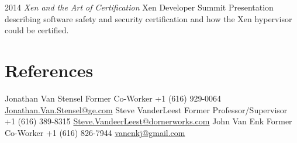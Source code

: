 \documentclass[print]{template/friggeri-cv} %
\begin{document}
\begin{entrylist}
\longentry
{2014}
{\emph{Xen and the Art of Certification}}
{Xen Developer Summit}
{Presentation describing software safety and security certification and how the Xen hypervisor could be certified.}
\end{entrylist}

\section{References}

\begin{entrylist}
\nodateentry
{Jonathan Van Stensel}
{Former Co-Worker}
{+1 (616) 929-0064 \href{mailto:Jonathan.Van.Stensel@ge.com}{Jonathan.Van.Stensel@ge.com}}
\nodateentry
{Steve VanderLeest}
{Former Professor/Supervisor}
{+1 (616) 389-8315 \href{mailto:Steve.VanderLeest@dornerworks.com}{Steve.VandeerLeest@dornerworks.com}}
\nodateentry
{John Van Enk}
{Former Co-Worker}
{+1 (616) 826-7944 \href{mailto:vanenkj@gmail.com}{vanenkj@gmail.com}}
\end{entrylist}









\end{document}

